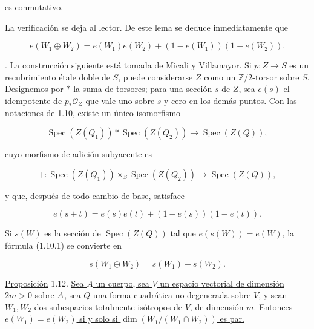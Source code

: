 \underline{es conmutativo.}

\pageoriginale

La verificación se deja al lector. De este lema se deduce inmediatamente
que

\begin{equation}\tag{1.10.1}
e(W_1\oplus W_2)
=e(W_1)e(W_2)+(1-e(W_1))(1-e(W_2)).
\end{equation}

\medskip
{}. La construcción siguiente está tomada de Micali y
Villamayor. Si $p:Z\longrightarrow S$ es un recubrimiento étale doble de
$S$, puede considerarse $Z$ como un $\mathbb Z/2$-torsor sobre $S$.
Designemos por $*$ la suma de torsores; para una sección $s$ de $Z$, sea
$e(s)$ el idempotente de $p_*\mathcal O_Z$ que vale uno sobre $s$ y cero
en los demás puntos. Con las notaciones de 1.10, existe un único
isomorfismo

\begin{equation}\tag{1.11.1}
\operatorname{Spec}(Z(Q_1))*\operatorname{Spec}(Z(Q_2))
\longrightarrow\operatorname{Spec}(Z(Q)),
\end{equation}

cuyo morfismo de adición subyacente es

\begin{equation*}
+:\operatorname{Spec}(Z(Q_1))\times_S\operatorname{Spec}(Z(Q_2))
\longrightarrow\operatorname{Spec}(Z(Q)),
\end{equation*}

y que, después de todo cambio de base, satisface

\begin{equation*}
e(s+t)=e(s)e(t)+(1-e(s))(1-e(t)).
\end{equation*}

Si $s(W)$ es la sección de $\operatorname{Spec}(Z(Q))$ tal que
$e(s(W))=e(W)$, la fórmula (1.10.1) se convierte en

\begin{equation*}
s(W_1\oplus W_2)=s(W_1)+s(W_2).
\end{equation*}

\medskip
\noindent\underline{Proposición} 1.12.\quad
\underline{Sea $A$ un cuerpo, sea $V$ un espacio vectorial de dimensión
$2m>0$ sobre $\sisi{V}{A}$, sea $Q$ una forma cuadrática no degenerada
sobre $V$, y sean $W_1,W_2$ dos subespacios totalmente isótropos de $V$,
de dimensión $m$. Entonces $e(W_1)=e(W_2)$ si y solo si
$\dim(W_1/(W_1\cap W_2))$ es par.}


\pageoriginale

